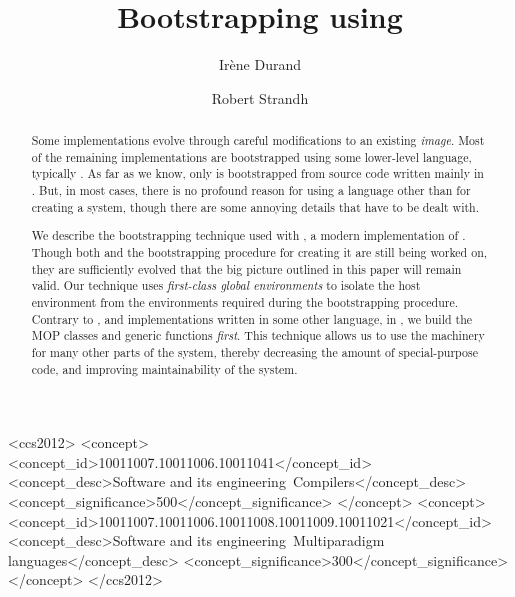 \documentclass[format=sigconf]{acmart}
\begin{document}
\title{Bootstrapping \commonlisp{} using \commonlisp{}}

\author{Irène Durand
}

\author{Robert Strandh}


\begin{abstract}
Some \commonlisp{} implementations evolve through careful
modifications to an existing \emph{image}.  Most of the remaining
implementations are bootstrapped using some lower-level language,
typically \clanguage{}.  As far as we know, only \sbcl{} is
bootstrapped from source code written mainly in \commonlisp{}.  But,
in most cases, there is no profound reason for using a language other
than \commonlisp{} for creating a \commonlisp{} system, though there
are some annoying details that have to be dealt with.

We describe the bootstrapping technique used with \sicl{},
a modern
implementation of \commonlisp{}.  Though both \sicl{} and the
bootstrapping procedure for creating it are still being worked on, they
are sufficiently evolved that the big picture outlined in this paper
will remain valid.  Our technique uses \emph{first-class global
  environments} to isolate the host environment from the environments
required during the bootstrapping procedure.  Contrary to \sbcl{}, and
implementations written in some other language, in \sicl{}, we build
the \clos{} MOP%
classes and generic functions \emph{first}.  This
technique allows us to use the \clos{} machinery for many other parts
of the system, thereby decreasing the amount of special-purpose code,
and improving maintainability of the system.
\end{abstract}

\begin{CCSXML}
<ccs2012>
<concept>
<concept_id>10011007.10011006.10011041</concept_id>
<concept_desc>Software and its engineering~Compilers</concept_desc>
<concept_significance>500</concept_significance>
</concept>
<concept>
<concept_id>10011007.10011006.10011008.10011009.10011021</concept_id>
<concept_desc>Software and its engineering~Multiparadigm languages</concept_desc>
<concept_significance>300</concept_significance>
</concept>
</ccs2012>
\end{CCSXML}
\end{document}
